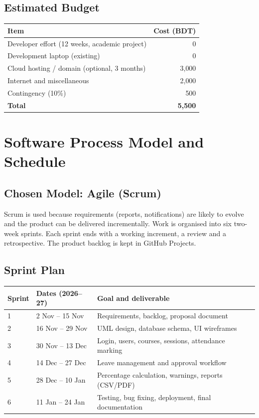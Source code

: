 \documentclass[11pt,a4paper]{article}
\begin{document}
\subsection{Estimated Budget}
\begin{tabularx}{\textwidth}{|X|r|}
\hline
\textbf{Item} & \textbf{Cost (BDT)}\\
\hline
Developer effort (12 weeks, academic project) & 0\\ \hline
Development laptop (existing) & 0\\ \hline
Cloud hosting / domain (optional, 3 months) & 3{,}000\\ \hline
Internet and miscellaneous & 2{,}000\\ \hline
Contingency (10\%) & 500\\ \hline
\textbf{Total} & \textbf{5{,}500}\\
\hline
\end{tabularx}

\section{Software Process Model and Schedule}
\subsection{Chosen Model: Agile (Scrum)}
Scrum is used because requirements (reports, notifications) are likely to evolve and the
product can be delivered incrementally. Work is organised into six two-week sprints.
Each sprint ends with a working increment, a review and a retrospective. The product backlog is kept
in GitHub Projects.

\subsection{Sprint Plan}
\begin{tabularx}{\textwidth}{|l|l|X|}
\hline
\textbf{Sprint} & \textbf{Dates (2026--27)} & \textbf{Goal and deliverable}\\
\hline
1 & 2 Nov -- 15 Nov & Requirements, backlog, proposal document\\ \hline
2 & 16 Nov -- 29 Nov & UML design, database schema, UI wireframes\\ \hline
3 & 30 Nov -- 13 Dec & Login, users, courses, sessions, attendance marking\\ \hline
4 & 14 Dec -- 27 Dec & Leave management and approval workflow\\ \hline
5 & 28 Dec -- 10 Jan & Percentage calculation, warnings, reports (CSV/PDF)\\ \hline
6 & 11 Jan -- 24 Jan & Testing, bug fixing, deployment, final documentation\\
\hline
\end{tabularx}
\end{document}

